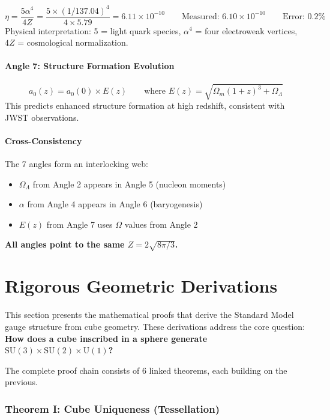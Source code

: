 \documentclass[11pt,a4paper]{article}
\theoremstyle{plain}
\theoremstyle{definition}
\theoremstyle{remark}
\newcommand{\Omegam}{\Omega_m}
\newcommand{\OmegaL}{\Omega_\Lambda}
\newcommand{\SUthree}{\text{SU}(3)}
\newcommand{\SUtwo}{\text{SU}(2)}
\newcommand{\Uone}{\text{U}(1)}
\begin{document}
\[
\eta = \frac{5\alpha^4}{4Z} = \frac{5 \times (1/137.04)^4}{4 \times 5.79} = 6.11 \times 10^{-10} \qquad \text{Measured: } 6.10 \times 10^{-10} \qquad \text{Error: } 0.2\%
\]
Physical interpretation: 5 = light quark species, $\alpha^4$ = four electroweak vertices, $4Z$ = cosmological normalization.

\subsection{Angle 7: Structure Formation Evolution}

\[
a_0(z) = a_0(0) \times E(z) \qquad \text{where } E(z) = \sqrt{\Omegam(1+z)^3 + \OmegaL}
\]
This predicts enhanced structure formation at high redshift, consistent with JWST observations.

\subsection{Cross-Consistency}

The 7 angles form an interlocking web:
\begin{itemize}
  \item $\OmegaL$ from Angle 2 appears in Angle 5 (nucleon moments)
  \item $\alpha$ from Angle 4 appears in Angle 6 (baryogenesis)
  \item $E(z)$ from Angle 7 uses $\Omega$ values from Angle 2
\end{itemize}
\textbf{All angles point to the same $Z = 2\sqrt{8\pi/3}$.}

\part{Rigorous Geometric Derivations}

This section presents the mathematical proofs that derive the Standard Model gauge structure from cube geometry. These derivations address the core question: \textbf{How does a cube inscribed in a sphere generate $\SUthree \times \SUtwo \times \Uone$?}

The complete proof chain consists of 6 linked theorems, each building on the previous.

\section{Theorem I: Cube Uniqueness (Tessellation)}
\end{document}
